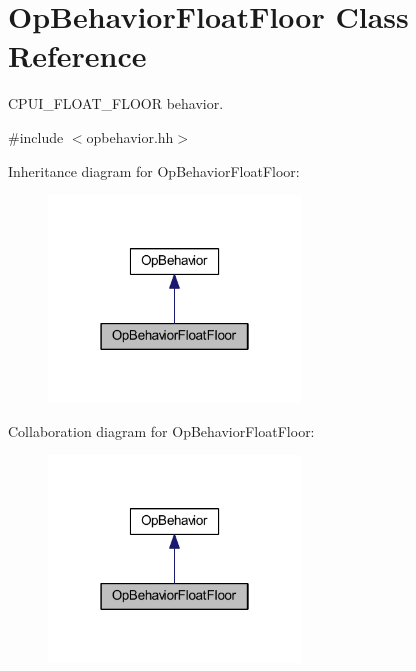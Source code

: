 \hypertarget{class_op_behavior_float_floor}{}\section{Op\+Behavior\+Float\+Floor Class Reference}
\label{class_op_behavior_float_floor}


C\+P\+U\+I\+\_\+\+F\+L\+O\+A\+T\+\_\+\+F\+L\+O\+OR behavior.  




{\ttfamily \#include $<$opbehavior.\+hh$>$}



Inheritance diagram for Op\+Behavior\+Float\+Floor\+:
\nopagebreak
\begin{figure}[H]
\begin{center}
\leavevmode
\includegraphics[width=190pt]{class_op_behavior_float_floor__inherit__graph}
\end{center}
\end{figure}


Collaboration diagram for Op\+Behavior\+Float\+Floor\+:
\nopagebreak
\begin{figure}[H]
\begin{center}
\leavevmode
\includegraphics[width=190pt]{class_op_behavior_float_floor__coll__graph}
\end{center}
\end{figure}
